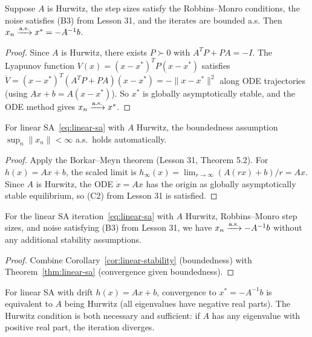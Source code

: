 \documentclass[11pt,a4paper]{article}
\begin{document}
\begin{theorem}
\label{thm:linear-sa}
Suppose $A$ is Hurwitz, the step sizes satisfy the Robbins--Monro
conditions, the noise satisfies (B3) from Lesson 31, and the iterates
are bounded a.s. Then $x_n \xrightarrow{\text{a.s.}} x^* = -A^{-1}b$.
\end{theorem}

\begin{proof}
Since $A$ is Hurwitz, there exists $P \succ 0$ with $A^TP + PA = -I$.
The Lyapunov function $V(x) = (x-x^*)^TP(x-x^*)$ satisfies
$\dot{V} = (x-x^*)^T(A^TP+PA)(x-x^*) = -\|x-x^*\|^2$ along ODE
trajectories (using $Ax+b = A(x-x^*)$). So $x^*$ is globally
asymptotically stable, and the ODE method gives $x_n \xrightarrow{\text{a.s.}} x^*$.
\end{proof}

\begin{corollary}
\label{cor:linear-stability}
For linear SA~\eqref{eq:linear-sa} with $A$ Hurwitz, the boundedness
assumption $\sup_n \|x_n\| < \infty$ a.s.\ holds automatically.
\end{corollary}

\begin{proof}
Apply the Borkar--Meyn theorem (Lesson 31, Theorem 5.2). For
$h(x) = Ax + b$, the scaled limit is
$h_\infty(x) = \lim_{r \to \infty}(A(rx)+b)/r = Ax$. Since $A$ is
Hurwitz, the ODE $\dot{x} = Ax$ has the origin as globally
asymptotically stable equilibrium, so (C2) from Lesson 31 is
satisfied.
\end{proof}

\begin{theorem}
\label{thm:linear-sa-complete}
For the linear SA iteration~\eqref{eq:linear-sa} with $A$ Hurwitz,
Robbins--Monro step sizes, and noise satisfying (B3) from Lesson 31,
we have $x_n \xrightarrow{\text{a.s.}} -A^{-1}b$ without any additional stability
assumptions.
\end{theorem}

\begin{proof}
Combine Corollary~\ref{cor:linear-stability} (boundedness) with
Theorem~\ref{thm:linear-sa} (convergence given boundedness).
\end{proof}

\begin{keyresult}[title={Linear SA: The Hurwitz Condition}]
For linear SA with drift $h(x) = Ax + b$, convergence to
$x^* = -A^{-1}b$ is equivalent to $A$ being Hurwitz (all
eigenvalues have negative real parts). The Hurwitz condition is
both necessary and sufficient: if $A$ has any eigenvalue with
positive real part, the iteration diverges.
\end{keyresult}
\end{document}
